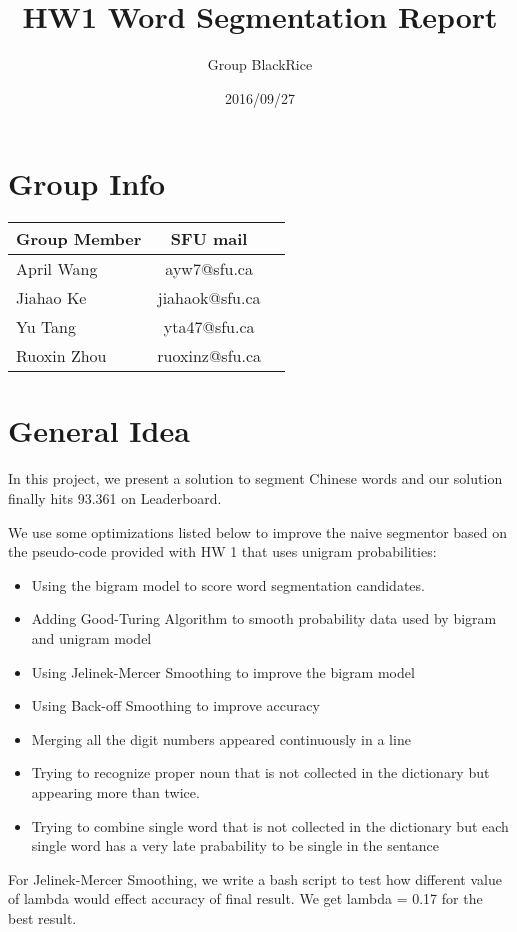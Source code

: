 \documentclass{article}
\title{HW1 Word Segmentation Report}
\author{Group BlackRice}
\date{2016/09/27}
\begin{document}
\maketitle
\section{Group Info}
\begin{tabular}{|l|c|r|}
\hline
Group Member& SFU mail\\
\hline
April Wang & ayw7@sfu.ca\\
\hline
Jiahao Ke & jiahaok@sfu.ca\\
\hline
Yu Tang & yta47@sfu.ca\\
\hline
Ruoxin Zhou& ruoxinz@sfu.ca\\
\hline
\end{tabular}
\section{General Idea}

In this project, we present a solution to segment Chinese words and our solution finally hits 93.361 on Leaderboard.

We use some optimizations listed below to improve the naive segmentor based on the pseudo-code provided with HW 1 that uses unigram probabilities:

\begin{itemize}
\item Using the bigram model to score word segmentation candidates. 
\item Adding Good-Turing Algorithm to smooth probability data used by bigram and unigram model
\item Using Jelinek-Mercer Smoothing to improve the bigram model
\item Using Back-off Smoothing to improve accuracy
\item Merging all the digit numbers appeared continuously in a line
\item Trying to recognize proper noun that is not collected in the dictionary but appearing more than twice.
\item Trying to combine single word that is not collected in the dictionary but each single word has a very late prabability to be single in the sentance
\end{itemize}

For Jelinek-Mercer Smoothing, we write a bash script to test how different value of lambda would effect accuracy of final result. We get lambda = 0.17 for the best result.
\end{document}
